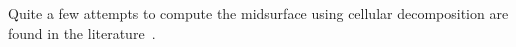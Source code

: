 

Quite a few attempts to compute the midsurface using cellular decomposition are found in the literature~\cite{Chong2004, Cao2009,Cao2011,Woo2013}. 


%


